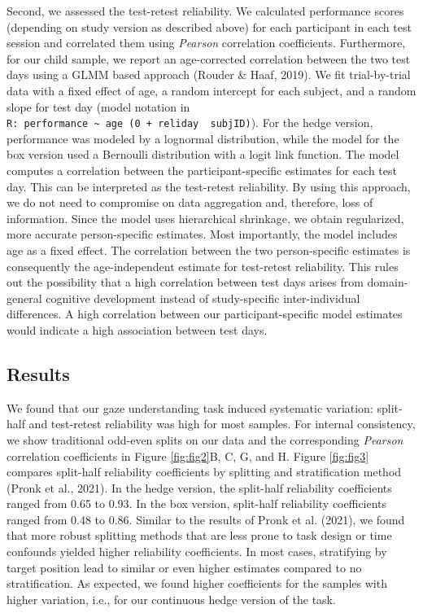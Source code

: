 \documentclass[
  man,floatsintext]{apa6}
\begin{document}
Second, we assessed the test-retest reliability.
We calculated performance scores (depending on study version as described above) for each participant in each test session and correlated them using \emph{Pearson} correlation coefficients.
Furthermore, for our child sample, we report an age-corrected correlation between the two test days using a GLMM based approach (Rouder \& Haaf, 2019).
We fit trial-by-trial data with a fixed effect of age, a random intercept for each subject, and a random slope for test day (model notation in \texttt{R:\ performance\ \textasciitilde{}\ age\ (0\ +\ reliday\ \textbar{}\ subjID)}).
For the hedge version, performance was modeled by a lognormal distribution, while the model for the box version used a Bernoulli distribution with a logit link function.
The model computes a correlation between the participant-specific estimates for each test day.
This can be interpreted as the test-retest reliability.
By using this approach, we do not need to compromise on data aggregation and, therefore, loss of information.
Since the model uses hierarchical shrinkage, we obtain regularized, more accurate person-specific estimates.
Most importantly, the model includes age as a fixed effect.
The correlation between the two person-specific estimates is consequently the age-independent estimate for test-retest reliability.
This rules out the possibility that a high correlation between test days arises from domain-general cognitive development instead of study-specific inter-individual differences.
A high correlation between our participant-specific model estimates would indicate a high association between test days.

\hypertarget{results-1}{%
\subsection{Results}\label{results-1}}

We found that our gaze understanding task induced systematic variation: split-half and test-retest reliability was high for most samples.
For internal consistency, we show traditional odd-even splits on our data and the corresponding \emph{Pearson} correlation coefficients in Figure \ref{fig:fig2}B, C, G, and H.
Figure \ref{fig:fig3} compares split-half reliability coefficients by splitting and stratification method (Pronk et al., 2021).
In the hedge version, the split-half reliability coefficients ranged from 0.65 to 0.93.
In the box version, split-half reliability coefficients ranged from 0.48 to 0.86.
Similar to the results of Pronk et al. (2021), we found that more robust splitting methods that are less prone to task design or time confounds yielded higher reliability coefficients.
In most cases, stratifying by target position lead to similar or even higher estimates compared to no stratification.
As expected, we found higher coefficients for the samples with higher variation, i.e., for our continuous hedge version of the task.
\end{document}
